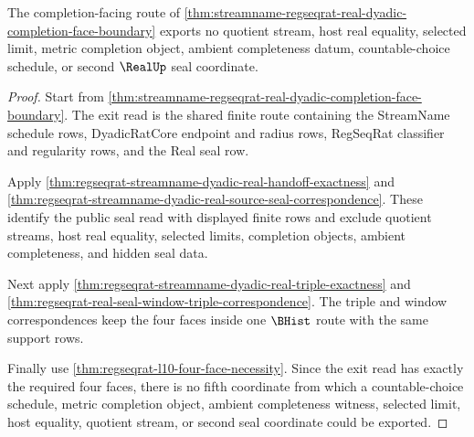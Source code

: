 \begin{theorem}
\label{thm:streamname-regseqrat-real-completion-face-nonescape}
The completion-facing route of \autoref{thm:streamname-regseqrat-real-dyadic-completion-face-boundary} exports no quotient stream, host real equality, selected limit, metric completion object, ambient completeness datum, countable-choice schedule, or second $\RealUp$ seal coordinate.
\end{theorem}
\begin{proof}
Start from \autoref{thm:streamname-regseqrat-real-dyadic-completion-face-boundary}. The exit read is the shared finite route containing the StreamName schedule rows, DyadicRatCore endpoint and radius rows, RegSeqRat classifier and regularity rows, and the Real seal row.

Apply \autoref{thm:regseqrat-streamname-dyadic-real-handoff-exactness} and \autoref{thm:regseqrat-streamname-dyadic-real-source-seal-correspondence}. These identify the public seal read with displayed finite rows and exclude quotient streams, host real equality, selected limits, completion objects, ambient completeness, and hidden seal data.

Next apply \autoref{thm:regseqrat-streamname-dyadic-real-triple-exactness} and \autoref{thm:regseqrat-real-seal-window-triple-correspondence}. The triple and window correspondences keep the four faces inside one $\BHist$ route with the same support rows.

Finally use \autoref{thm:regseqrat-l10-four-face-necessity}. Since the exit read has exactly the required four faces, there is no fifth coordinate from which a countable-choice schedule, metric completion object, ambient completeness witness, selected limit, host equality, quotient stream, or second seal coordinate could be exported.
\end{proof}

